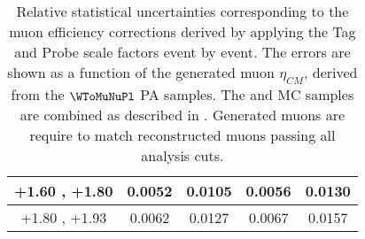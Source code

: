 \begin{table}[h!]
\begin{tabular}{|c|*4c|}
    \hline
    +1.60 , +1.80 & 0.0052 & 0.0105 & 0.0056 & 0.0130\\
    \hline
    +1.80 , +1.93 & 0.0062 & 0.0127 & 0.0067 & 0.0157\\
    \hline
  \end{tabular}
  \caption{Relative statistical uncertainties corresponding to the muon efficiency corrections derived by applying the Tag and Probe scale factors event by event. The errors are shown as a function of the generated muon $\eta_{CM}$, derived from the $\WToMuNuPl$ PA \POWHEG samples. The \pPb and \Pbp MC samples are combined as described in . Generated muons are require to match reconstructed muons passing all analysis cuts.}
  \label{tab:tnpStatUncertainty_WToMu_Plus_PA}
\end{table}


